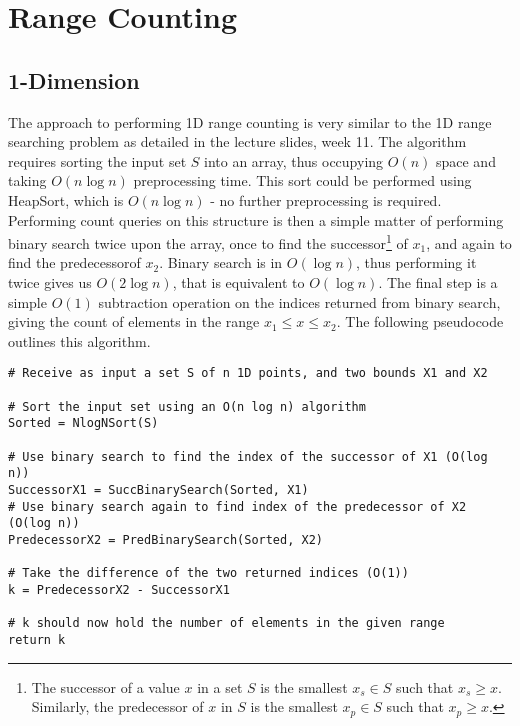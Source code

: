 \documentclass[paper=a4, fontsize=12pt]{article}
\begin{document}
\setcounter{section}{2}
\section{Range Counting}

\subsection{1-Dimension}
\label{subsec:1drangecount}

The approach to performing 1D range counting is very similar to the 1D range
searching problem as detailed in the lecture slides, week 11. The algorithm
requires sorting the input set \(S\) into an array, thus occupying \(O(n)\)
space and taking \(O(n \log n)\) preprocessing time. This sort could be
performed using HeapSort, which is \(O(n \log n)\) - no further preprocessing
is required. Performing count queries on this structure is then a simple matter
of performing binary search twice upon the array, once to find the
successor\footnote{The successor of a value \(x\) in a set \(S\) is the
 smallest \(x_s \in S\) such that \(x_s \geq x\). Similarly, the predecessor
 of \(x\) in \(S\) is the smallest \(x_p \in S\) such that \(x_p \geq x\).} of
\(x_1\), and again to find the predecessor\footnotemark[\value{footnote}] of
\(x_2\). Binary search is in \(O(\log n)\), thus performing it twice gives us
\(O(2 \log n)\), that is equivalent to \(O(\log n)\). The final step is a
simple \(O(1)\) subtraction operation on the indices returned from binary
search, giving the count of elements in the range \(x_1 \leq x \leq x_2\). The
following pseudocode outlines this algorithm.

\begin{lstlisting}
# Receive as input a set S of n 1D points, and two bounds X1 and X2

# Sort the input set using an O(n log n) algorithm
Sorted = NlogNSort(S)

# Use binary search to find the index of the successor of X1 (O(log n))
SuccessorX1 = SuccBinarySearch(Sorted, X1)
# Use binary search again to find index of the predecessor of X2 (O(log n))
PredecessorX2 = PredBinarySearch(Sorted, X2)

# Take the difference of the two returned indices (O(1))
k = PredecessorX2 - SuccessorX1

# k should now hold the number of elements in the given range
return k
\end{lstlisting}
\end{document}
